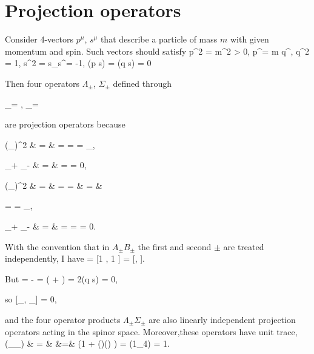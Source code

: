 \section{Projection operators} \label{gammaProj}

Consider 4-vectors $p^\mu$, $s^\mu$ that describe a particle of mass $m$
with given momentum and spin. 
Such vectors should satisfy
p^2 = m^2 > 0, \quad
p^\mu = m q^\mu, \quad
q^2 = 1, \quad
s^2 = s_\mu s^\mu = -1,
\quad (p \cdot s) = (q \cdot s) = 0
\ee

Then four operators $\Lambda_\pm$, $\Sigma_\pm$ defined through

\be
\Lambda_\pm = , \qquad
\Sigma_\pm = 
\ee

are projection operators because

\bem
(\Lambda_\pm)^2  & = & 
=  =  = \Lambda_\pm,

\nel
\Lambda_+ \Lambda_- & = &
 =  = 0,

\nel
(\Sigma_\pm)^2  & = & 
= 
= 
\nel & = &

=  = \Sigma_\pm,

\nel
\Sigma_+ \Sigma_-
& = & 
= 
=  = 0.
\ee


With the convention that in $A_\pm B_\pm$
the first and second $\pm$ are treated independently, I have
\be
[\Lambda_\pm, \Sigma_\pm]  = 
[1 \pm \qc, 1 \pm {}]
 = [\qc, ].
\ee

But
\be
[\qc, \slsh{s}\gd5] = \qc{} - \qc 
= (\qc{} + \qc) = 2(q \cdot s) = 0,
\ee 

so
[\Lambda_\pm, \Sigma_\pm]  = 0,
\ee

and the four operator products 
$\Lambda_\pm\Sigma_\pm$ are also linearly independent
projection operators acting in the spinor space. 
Moreover,these operators have unit trace,
\bem
\Tr(\Lambda_\pm\Sigma_\pm) & = &
 \Tr[(1 \pm \qc)(1 \pm \slsh{s}\gd5)]
\nel &=&
 \Tr(1 \pm {} \pm \qc + ()() \qc{})
=  \Tr(1_{4}) = 1.
\ee

